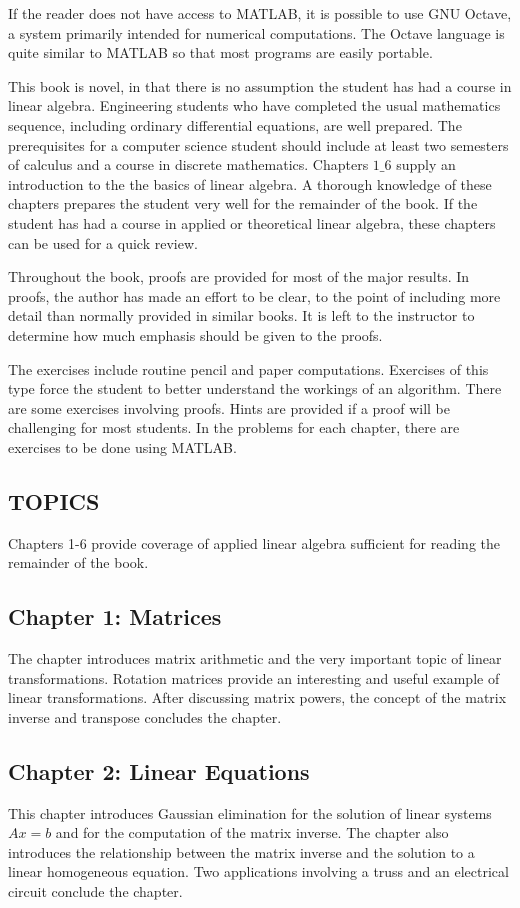 \documentclass[../main.tex]{subfiles}
\begin{document}
If the reader does not have access to MATLAB, it is possible to use GNU Octave, a system primarily intended for numerical computations. The Octave language is quite similar to MATLAB so that most programs are easily portable.

This book is novel, in that there is no assumption the student has had a course in linear algebra. Engineering students who have completed the usual mathematics sequence, including ordinary differential equations, are well prepared. The prerequisites for a computer science student should include at least two semesters of calculus and a course in discrete mathematics. Chapters $1 \_ 6$ supply an introduction to the the basics of linear algebra. A thorough knowledge of these chapters prepares the student very well for the remainder of the book. If the student has had a course in applied or theoretical linear algebra, these chapters can be used for a quick review.

Throughout the book, proofs are provided for most of the major results. In proofs, the author has made an effort to be clear, to the point of including more detail than normally provided in similar books. It is left to the instructor to determine how much emphasis should be given to the proofs.

The exercises include routine pencil and paper computations. Exercises of this type force the student to better understand the workings of an algorithm. There are some exercises involving proofs. Hints are provided if a proof will be challenging for most students. In the problems for each chapter, there are exercises to be done using MATLAB.

\subsection*{TOPICS}
Chapters 1-6 provide coverage of applied linear algebra sufficient for reading the remainder of the book.

\subsection*{Chapter 1: Matrices}
The chapter introduces matrix arithmetic and the very important topic of linear transformations. Rotation matrices provide an interesting and useful example of linear transformations. After discussing matrix powers, the concept of the matrix inverse and transpose concludes the chapter.

\subsection*{Chapter 2: Linear Equations}
This chapter introduces Gaussian elimination for the solution of linear systems $Ax = b$ and for the computation of the matrix inverse. The chapter also introduces the relationship between the matrix inverse and the solution to a linear homogeneous equation. Two applications involving a truss and an electrical circuit conclude the chapter.
\end{document}
